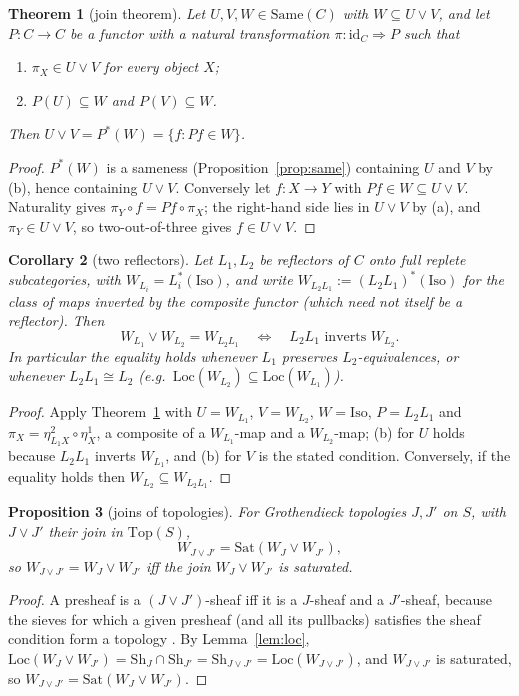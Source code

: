 \documentclass[11pt]{amsart}
\newtheorem{thm}{Theorem}[section]
\newtheorem{cor}[thm]{Corollary}
\newtheorem{prop}[thm]{Proposition}
\theoremstyle{definition}
\newcommand{\Same}{\mathrm{Same}}
\newcommand{\Top}{\mathrm{Top}}
\newcommand{\Iso}{\mathrm{Iso}}
\newcommand{\Sh}{\mathrm{Sh}}
\begin{document}
\begin{thm}[join theorem]\label{thm:generaljoin}
Let $U,V,W\in\Same(C)$ with $W\subseteq U\vee V$, and let $P\colon C\to C$ be
a functor with a natural transformation $\pi\colon\mathrm{id}_C\Rightarrow P$
such that
\begin{enumerate}
\item[(a)] $\pi_X\in U\vee V$ for every object $X$;
\item[(b)] $P(U)\subseteq W$ and $P(V)\subseteq W$.
\end{enumerate}
Then $U\vee V=P^*(W)=\{f:Pf\in W\}$.
\end{thm}
\begin{proof}
$P^*(W)$ is a sameness (Proposition~\ref{prop:same}) containing $U$ and $V$
by (b), hence containing $U\vee V$. Conversely let $f\colon X\to Y$ with
$Pf\in W\subseteq U\vee V$. Naturality gives $\pi_Y\circ f=Pf\circ\pi_X$; the
right-hand side lies in $U\vee V$ by (a), and $\pi_Y\in U\vee V$, so
two-out-of-three gives $f\in U\vee V$.
\end{proof}

\begin{cor}[two reflectors]\label{cor:tworeflectors}
Let $L_1,L_2$ be reflectors of $C$ onto full replete subcategories, with
$W_{L_i}=L_i^*(\Iso)$, and write $W_{L_2L_1}:=(L_2L_1)^*(\Iso)$ for the class
of maps inverted by the composite functor (which need not itself be a
reflector). Then
\[
W_{L_1}\vee W_{L_2}=W_{L_2L_1}\quad\Longleftrightarrow\quad
L_2L_1\text{ inverts }W_{L_2}.
\]
In particular the equality holds whenever $L_1$ preserves $L_2$-equivalences,
or whenever $L_2L_1\cong L_2$ (e.g.\ $\mathrm{Loc}(W_{L_2})\subseteq
\mathrm{Loc}(W_{L_1})$).
\end{cor}
\begin{proof}
Apply Theorem~\ref{thm:generaljoin} with $U=W_{L_1}$, $V=W_{L_2}$, $W=\Iso$,
$P=L_2L_1$ and $\pi_X=\eta^2_{L_1X}\circ\eta^1_X$, a composite of a
$W_{L_1}$-map and a $W_{L_2}$-map; (b) for $U$ holds because $L_2L_1$ inverts
$W_{L_1}$, and (b) for $V$ is the stated condition. Conversely, if the
equality holds then $W_{L_2}\subseteq W_{L_2L_1}$.
\end{proof}

\begin{prop}[joins of topologies]\label{prop:topjoin}
For Grothendieck topologies $J,J'$ on $S$, with $J\vee J'$ their join in
$\Top(S)$,
\[
W_{J\vee J'}=\mathrm{Sat}(W_J\vee W_{J'}),
\]
so $W_{J\vee J'}=W_J\vee W_{J'}$ iff the join $W_J\vee W_{J'}$ is saturated.
\end{prop}
\begin{proof}
A presheaf is a $(J\vee J')$-sheaf iff it is a $J$-sheaf and a $J'$-sheaf,
because the sieves for which a given presheaf (and all its pullbacks)
satisfies the sheaf condition form a topology \cite[C2.1]{Elephant}. By
Lemma~\ref{lem:loc}, $\mathrm{Loc}(W_J\vee W_{J'})=\Sh_J\cap\Sh_{J'}
=\Sh_{J\vee J'}=\mathrm{Loc}(W_{J\vee J'})$, and $W_{J\vee J'}$ is saturated,
so $W_{J\vee J'}=\mathrm{Sat}(W_J\vee W_{J'})$.
\end{proof}
\end{document}
